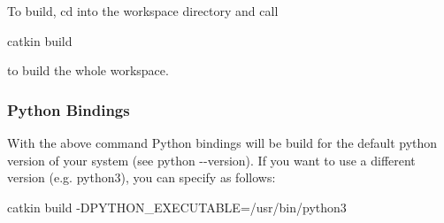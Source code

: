 To build, cd into the {\ttfamily workspace} directory and call \begin{DoxyVerb}catkin build
\end{DoxyVerb}


to build the whole workspace.

\subsubsection*{Python Bindings}

With the above command Python bindings will be build for the default python version of your system (see {\ttfamily python -\/-\/version}). If you want to use a different version (e.\+g. python3), you can specify as follows\+: \begin{DoxyVerb}catkin build -DPYTHON_EXECUTABLE=/usr/bin/python3\end{DoxyVerb}
 